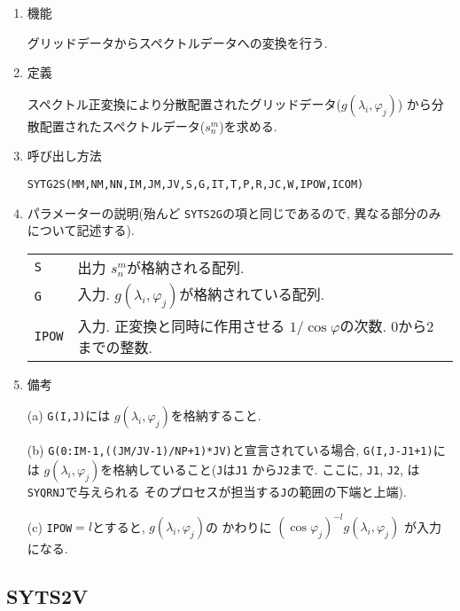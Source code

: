 \documentclass[a4j]{jsarticle}
\begin{document}
\begin{enumerate}

\item 機能 

グリッドデータからスペクトルデータへの変換を行う.

\item 定義

スペクトル正変換により分散配置されたグリッドデータ($g(\lambda_i,\varphi_j)$)
から分散配置されたスペクトルデータ($s^m_n$)を求める.

\item 呼び出し方法 

\texttt{SYTG2S(MM,NM,NN,IM,JM,JV,S,G,IT,T,P,R,JC,W,IPOW,ICOM)}  

\item パラメーターの説明(殆んど \texttt{SYTS2G}の項と同じであるので,
異なる部分のみについて記述する).

\begin{tabular}{ll}
\texttt{S} & 出力 $s^m_n$が格納される配列.\\
\texttt{G} & 入力. $g(\lambda_i,\varphi_j)$が格納されている配列.\\
\texttt{IPOW} & 入力. 正変換と同時に作用させる
                      $1/\cos\varphi$の次数. 0から2までの整数.
\end{tabular}

\item 備考

(a) \texttt{G(I,J)}には
    $g(\lambda_i,\varphi_j)$を格納すること.

(b) \texttt{G(0:IM-1,((JM/JV-1)/NP+1)*JV)}と宣言されている場合, 
    \texttt{G(I,J-J1+1)}には
    $g(\lambda_i,\varphi_j)$を格納していること(\texttt{J}は\texttt{J1}
    から\texttt{J2}まで.
    ここに, \texttt{J1}, \texttt{J2}, は \texttt{SYQRNJ}で与えられる
    そのプロセスが担当する\texttt{J}の範囲の下端と上端).
    
(c) \texttt{IPOW}$=l$とすると, $g(\lambda_i,\varphi_j)$の
    かわりに $(\cos\varphi_j)^{-l}g(\lambda_i,\varphi_j)$ が入力
    になる.


   
\end{enumerate}


\subsection{SYTS2V}
\end{document}
